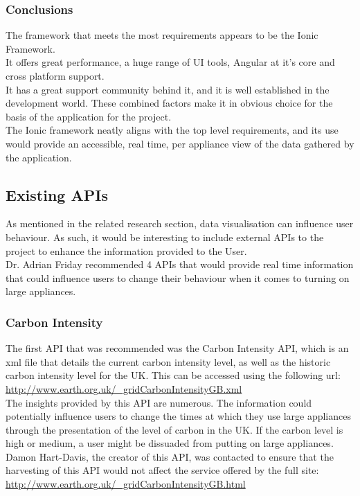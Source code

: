 \documentclass[preprint,12pt,3p]{elsarticle}
\begin{document}
\subsubsection{Conclusions}
The framework that meets the most requirements appears to be the Ionic Framework.\\
It offers great performance, a huge range of UI tools, Angular at it's core and cross platform support.\\
It has a great support community behind it, and it is well established in the development world. These combined factors make it in obvious choice for the basis of the application for the project.\\
The Ionic framework neatly aligns with the top level requirements, and its use would provide an accessible, real time, per appliance view of the data gathered by the application.

\clearpage
\subsection{Existing APIs}
As mentioned in the related research section, data visualisation can influence user behaviour. As such, it would be interesting to include external APIs to the project to enhance the information provided to the User.\\
Dr. Adrian Friday recommended 4 APIs that would provide real time information that could influence users to change their behaviour when it comes to turning on large appliances.


\subsubsection{Carbon Intensity}
The first API that was recommended was the Carbon Intensity API, which is an xml file that details the current carbon intensity level, as well as the historic carbon intensity level for the UK. This can be accessed using the following url:\\[5pt]
\url{http://www.earth.org.uk/_gridCarbonIntensityGB.xml}\\[5pt]
The insights provided by this API are numerous. The information could potentially influence users to change the times at which they use large appliances through the presentation of the level of carbon in the UK. If the carbon level is high or medium, a user might be dissuaded from putting on large appliances.\\
Damon Hart-Davis, the creator of this API, was contacted to ensure that the harvesting of this API would not affect the service offered by the full site:\\[5pt]
\url{http://www.earth.org.uk/_gridCarbonIntensityGB.html}
\end{document}
